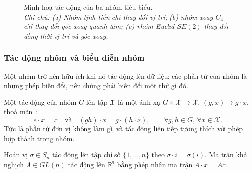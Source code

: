 \begin{figure}[H]
\caption[Minh hoạ tác động của ba nhóm tiêu biểu]{Minh hoạ tác động của ba nhóm tiêu biểu.\protect\\[2pt]
\textit{Ghi chú: (a) Nhóm tịnh tiến chỉ thay đổi vị trí; (b) nhóm xoay $C_4$ chỉ thay đổi góc xoay quanh tâm; (c) nhóm Euclid $SE(2)$ thay đổi đồng thời vị trí và góc xoay.}}
\label{fig:three_groups}
\end{figure}
 
\subsubsection{Tác động nhóm và biểu diễn nhóm}
\label{ssub:group-action}
 
Một nhóm trở nên hữu ích khi nó tác động lên dữ liệu: các phần tử của nhóm là những phép biến đổi, nên chúng phải biến đổi một thứ gì đó.
 
\begin{definition}
\label{def:tac-dong}
Một tác động của nhóm $G$ lên tập $\mathcal{X}$ là một ánh xạ $G\times\mathcal{X}\to\mathcal{X}$, $(g,x)\mapsto g\cdot x$, thoả mãn~\cite{bronstein2021geometric}:
\begin{equation}
e\cdot x = x \quad\text{và}\quad (gh)\cdot x = g\cdot(h\cdot x),
\qquad \forall g,h\in G,\ \forall x\in\mathcal{X}.
\end{equation}
Tức là phần tử đơn vị không làm gì, và tác động liên tiếp tương thích với phép
hợp thành trong nhóm.
\end{definition}
 
\begin{example}
\label{vd:action}
Hoán vị $\sigma\in S_{n}$ tác động lên tập chỉ số $\{1,\dots,n\}$ theo
$\sigma\cdot i = \sigma(i)$. Ma trận khả nghịch $A\in GL(n)$ tác động lên
$\mathbb{R}^{n}$ bằng phép nhân ma trận $A\cdot x = Ax$.
\end{example}
 
